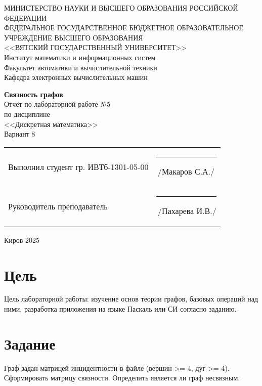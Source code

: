 \documentclass[a4paper,14pt]{extarticle}
\begin{document}
  \newpage\thispagestyle{empty}
  \begin{center}
    \MakeUppercase{
      Министерство науки и высшего образования Российской Федерации\\
      Федеральное государственное бюджетное образовательное учреждение высшего образования\\
      <<Вятский Государственный Университет>>\\
    }
    Институт математики и информационных систем\\
    Факультет автоматики и вычислительной техники\\
    Кафедра электронных вычислительных машин
  \end{center}
  \vfill

  \begin{center}
    \textbf{Связность графов}\\
    Отчёт по лабораторной работе №5\\
    по дисциплине\\
    <<Дискретная математика>>\\
    Вариант 8
  \end{center}
  \vfill

  \noindent
  \begin{tabular}{ll}
    Выполнил студент гр. ИВТб-1301-05-00 \hspace{5mm} &
    \rule[-1mm]{25mm}{0.10mm}\,/Макаров С.А./\\
    
    Руководитель преподаватель & \rule[-1mm]{25mm}{0.10mm}\,/Пахарева И.В./\\
  \end{tabular}

  \vfill
  \begin{center}
    Киров 2025
  \end{center}

  \newpage
  \section*{\hspace{12.5mm}Цель}
  Цель лабораторной работы: изучение основ теории графов, базовых операций над ними, разработка приложения на языке Паскаль или СИ согласно заданию.

  \section*{\hspace{12.5mm}Задание}
  Граф задан матрицей инцидентности в файле (вершин >= 4, дуг >= 4). Сформировать матрицу связности. Определить является ли граф несвязным.
\end{document}
